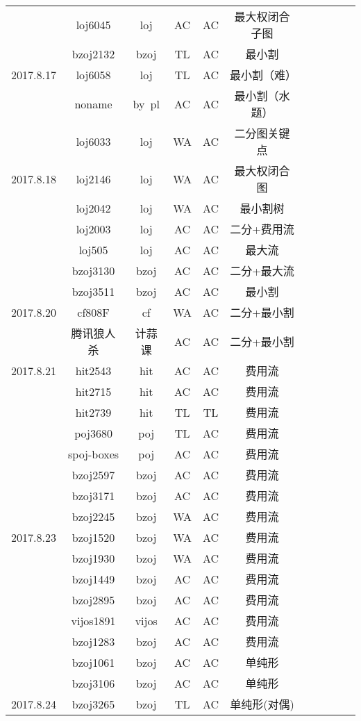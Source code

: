 \documentclass[landscape]{article}
\begin{document}
\begin{longtable}{ccccccccccc}
   & loj6045 & loj & AC & AC & 最大权闭合子图\\
   & bzoj2132 & bzoj & TL & AC & 最小割\\
  \hline
  2017.8.17 & loj6058 & loj & TL & AC & 最小割（难）\\
  & noname & by\ pl & AC & AC & 最小割（水题）\\
  & loj6033 & loj & WA & AC & 二分图关键点\\
  \hline
  2017.8.18 & loj2146 & loj & WA & AC & 最大权闭合图\\
  & loj2042 & loj & WA & AC & 最小割树\\
  & loj2003 & loj & AC & AC & 二分+费用流\\
  & loj505 & loj & AC & AC & 最大流\\
  & bzoj3130 & bzoj & AC & AC & 二分+最大流\\
  & bzoj3511 & bzoj & AC & AC & 最小割\\
  \hline
  2017.8.20 & cf808F & cf & WA & AC & 二分+最小割\\
  & 腾讯狼人杀 & 计蒜课 & AC & AC & 二分+最小割\\
  \hline
  2017.8.21 & hit2543 & hit & AC & AC & 费用流\\
  & hit2715 & hit & AC & AC & 费用流\\
  & hit2739 & hit & TL & {\color{pink}TL} & 费用流\\
  & poj3680 & poj & TL & AC & 费用流\\
  & spoj-boxes & poj & AC & AC & 费用流\\
  & bzoj2597 & bzoj & AC & AC & 费用流\\
  & bzoj3171 & bzoj & AC & AC & 费用流\\
  & bzoj2245 & bzoj & WA & AC & 费用流\\
  \hline
  2017.8.23 & bzoj1520 & bzoj & WA & AC & 费用流\\
  & bzoj1930 & bzoj & WA & AC & 费用流\\
  & bzoj1449 & bzoj & AC & AC & 费用流\\
  & bzoj2895 & bzoj & AC & AC & 费用流\\
  & vijos1891 & vijos & AC & AC & 费用流\\
  & bzoj1283 & bzoj & AC & AC & 费用流\\
  & bzoj1061 & bzoj & AC & AC & 单纯形\\
  & bzoj3106 & bzoj & AC & AC & 单纯形\\
  \hline
  2017.8.24 & bzoj3265 & bzoj & TL & AC & 单纯形(对偶)\\

\end{longtable}
\end{document}
